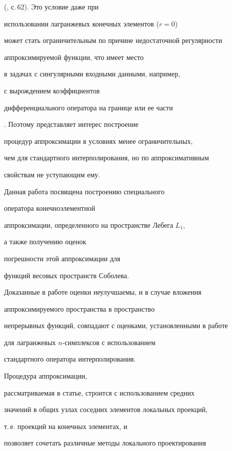 (\cite{Ciarlet}, с.\,62). Это условие даже при 


использовании лагранжевых конечных элементов ($r=0$) 


может стать ограничительным по причине недостаточной регулярности 


аппроксимируемой функции, что имеет место 


в задачах с сингулярными входными данными, например, 


с вырождением коэффициентов 


дифференциального оператора на границе или ее части 


\cite{Smirnov}. Поэтому представляет интерес построение 


процедур аппроксимации в условиях менее ограничительных, 


чем для стандартного интерполирования, но по аппроксимативным 


свойствам не уступающим ему. 





Данная работа посвящена построению специального 


оператора конечноэлементной 


аппроксимации, определенного на пространстве Лебега $L_1$, 


а также получению оценок


погрешности этой аппроксимации для 


функций весовых пространств Соболева. 


Доказанные в работе оценки неулучшаемы, и в случае вложения 


аппроксимируемого пространства в пространство 


непрерывных функций, совпадают с оценками, установленными в работе 


\cite{Izvuz-92} для лагранжевых $n$-симплексов с использованием 


стандартного оператора интерполирования. 





Процедура аппроксимации, 


рассматриваемая в статье, строится с использованием средних 


значений в общих узлах соседних элементов локальных проекций, 


т.\,е. проекций на конечных элементах, и 


позволяет сочетать различные методы локального проектирования 


